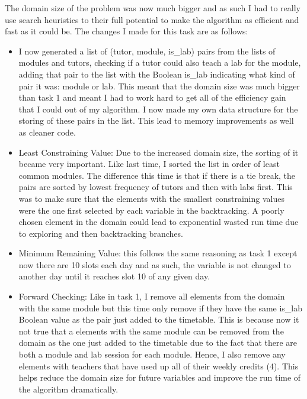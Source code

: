 \documentclass[conference]{IEEEtran}
\begin{document}
The domain size of the problem was now much bigger and as such I had to really use search heuristics to their full potential to make the algorithm as efficient and fast as it could be. The changes I made for this task are as follows:
\begin{itemize}
\item I now generated a list of (tutor, module, is\_lab) pairs from the lists of modules and tutors, checking if a tutor could also teach a lab for the module, adding that pair to the list with the Boolean is\_lab indicating what kind of pair it was: module or lab. This meant that the domain size was much bigger than task 1 and meant I had to work hard to get all of the efficiency gain that I could out of my algorithm. I now made my own data structure for the storing of these pairs in the list. This lead to memory improvements as well as cleaner code.
\item Least Constraining Value: Due to the increased domain size, the sorting of it became very important. Like last time, I sorted the list in order of least common modules. The difference this time is that if there is a tie break, the pairs are sorted by lowest frequency of tutors and then with labs first. This was to make sure that the elements with the smallest constraining values were the one first selected by each variable in the backtracking. A poorly chosen element in the domain could lead to exponential wasted run time due to exploring and then backtracking branches. 
\item Minimum Remaining Value: this follows the same reasoning as task 1 except now there are 10 slots each day and as such, the variable is not changed to another day until it reaches slot 10 of any given day.
\item Forward Checking: Like in task 1, I remove all elements from the domain with the same module but this time only remove if they have the same is\_lab Boolean value as the pair just added to the timetable. This is because now it not true that a elements with the same module can be removed from the domain as the one just added to the timetable due to the fact that there are both a module and lab session for each module. Hence, I also remove any elements with teachers that have used up all of their weekly credits (4). This helps reduce the domain size for future variables and improve the run time of the algorithm dramatically.


\end{itemize}
\end{document}
